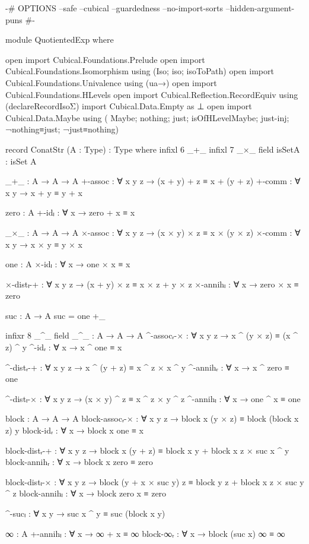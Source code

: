 \begin{code}[hide]
{-# OPTIONS
  --safe
  --cubical
  --guardedness
  --no-import-sorts
  --hidden-argument-puns #-}

module QuotientedExp where

open import Cubical.Foundations.Prelude
open import Cubical.Foundations.Isomorphism using (Iso; iso; isoToPath)
open import Cubical.Foundations.Univalence using (ua→)
open import Cubical.Foundations.HLevels
open import Cubical.Reflection.RecordEquiv using (declareRecordIsoΣ)
import Cubical.Data.Empty as ⊥
open import Cubical.Data.Maybe
  using
    ( Maybe; nothing; just;
      isOfHLevelMaybe; just-inj; ¬nothing≡just; ¬just≡nothing)

record ConatStr (A : Type) : Type where
  infixl 6 _+_
  infixl 7 _×_
  field
    isSetA : isSet A

    _+_ : A → A → A
    +-assoc : ∀ x y z → (x + y) + z ≡ x + (y + z)
    +-comm : ∀ x y → x + y ≡ y + x

    zero : A
    +-idₗ : ∀ x → zero + x ≡ x

    _×_ : A → A → A
    ×-assoc : ∀ x y z → (x × y) × z ≡ x × (y × z)
    ×-comm : ∀ x y → x × y ≡ y × x

    one : A
    ×-idₗ : ∀ x → one × x ≡ x

    ×-distₗ-+ : ∀ x y z → (x + y) × z ≡ x × z + y × z
    ×-annihₗ : ∀ x → zero × x ≡ zero

  suc : A → A
  suc = one +_

  infixr 8 _^_
  field
    _^_ : A → A → A
    ^-assocᵣ-× : ∀ x y z → x ^ (y × z) ≡ (x ^ z) ^ y
    ^-idᵣ : ∀ x → x ^ one ≡ x

    ^-distᵣ-+ : ∀ x y z → x ^ (y + z) ≡ x ^ z × x ^ y
    ^-annihᵣ : ∀ x → x ^ zero ≡ one

    ^-distₗ-× : ∀ x y z → (x × y) ^ z ≡ x ^ z × y ^ z
    ^-annihₗ : ∀ x → one ^ x ≡ one

    block : A → A → A
    block-assocᵣ-× : ∀ x y z → block x (y × z) ≡ block (block x z) y
    block-idᵣ : ∀ x → block x one ≡ x

    block-distᵣ-+ :
      ∀ x y z → block x (y + z) ≡ block x y + block x z × suc x ^ y
    block-annihᵣ : ∀ x → block x zero ≡ zero

    block-distₗ-× :
      ∀ x y z → block (y + x × suc y) z ≡ block y z + block x z × suc y ^ z
    block-annihₗ : ∀ x → block zero x ≡ zero

    ^-sucₗ : ∀ x y → suc x ^ y ≡ suc (block x y)

    ∞ : A
    +-annihₗ : ∀ x → ∞ + x ≡ ∞
    block-∞ᵣ : ∀ x → block (suc x) ∞ ≡ ∞


\end{code}
